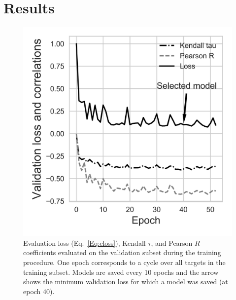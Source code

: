 \documentclass{bioinfo}
\begin{document}
\section{Results}
\begin{figure}[!tpb]
    \centerline{\includegraphics[width=0.7\linewidth]{image4.png}}
    \vspace{-15pt}
    \caption{Evaluation loss (Eq.~\ref{Eq:eloss}), Kendall $\tau$, and Pearson $R$ coefficients
      evaluated on the validation subset during the training
      procedure.  One epoch corresponds to a cycle over all targets in
      the training subset. Models are saved every 10 epochs and the
      arrow shows the minimum validation loss for which a model was
      saved (at epoch 40).}
    \label{Fig:TrainingLoss}
\end{figure}
\end{document}
